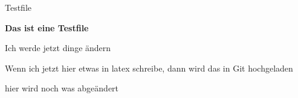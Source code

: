 \documentclass[10pt,a4paper]{article}
\begin{document}
\caption{Testfile}

\textbf{Das ist eine Testfile}

Ich werde jetzt dinge ändern

Wenn ich jetzt hier etwas in latex schreibe, dann wird das in Git hochgeladen

hier wird noch was abgeändert
\end{document}
